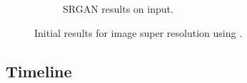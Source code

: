 \documentclass{article}
\begin{document}
\begin{figure}[h!]
\begin{subfigure}{0.45\textwidth}
\begin{center}
\begin{minipage}[t]{0.95\linewidth}
\begin{centering}
\caption{SRGAN results on input.}
\label{fig:srgan_outputs}
\end{centering}
\end{minipage}
\end{center}
\end{subfigure}
\caption{Initial results for image super resolution using \cite{srgan}.}
\label{fig:initial_results}
\end{figure}

\subsection{Timeline}
\label{subsec:timeline}

\nocite{pixel_cnn}



\end{document}
